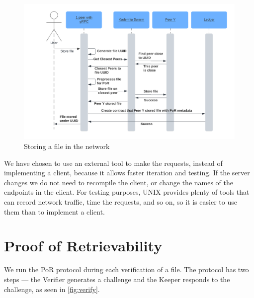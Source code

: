 \begin{figure}
    \centering
    \includegraphics[width=1\textwidth]{gfx/store.png}
    \caption{Storing a file in the network}
    \label{fig:store}
\end{figure}

We have chosen to use an external tool to make the requests,
instead of implementing a client, because it allows faster iteration and testing.
If the server changes we do not need to recompile the client,
or change the names of the endpoints in the client.
For testing purposes, UNIX provides plenty of tools that can record network traffic,
time the requests, and so on, so it is easier to use them than to implement a client.

\section{Proof of Retrievability}

We run the PoR protocol during each verification of a file.
The protocol has two steps --- the Verifier generates a challenge and
the Keeper responds to the challenge, as seen in \autoref{fig:verify}.

